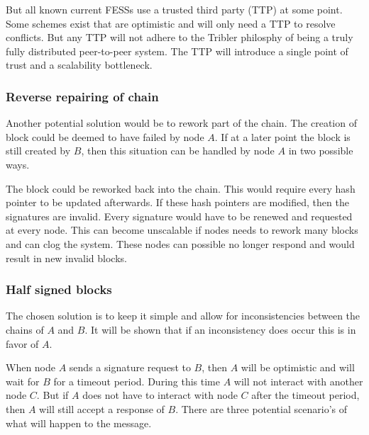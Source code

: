 But all known current FESSs use a trusted third party (TTP) at some point\cite{asokan-fairexchange}.
Some schemes exist that are optimistic and will only need a TTP to resolve conflicts.
But any TTP will not adhere to the Tribler philosphy 
of being a truly fully distributed peer-to-peer system.
The TTP will introduce a single point of trust and a scalability bottleneck.

\subsubsection{Reverse repairing of chain}
Another potential solution would be to rework part of the chain.
The creation of block could be deemed to have failed by node $A$.
If at a later point the block is still created by $B$,
then this situation can be handled by node $A$ in two possible ways.

The block could be reworked back into the chain.
This would require every hash pointer to be updated afterwards.
If these hash pointers are modified, then the signatures are invalid.
Every signature would have to be renewed and requested at every node.
This can become unscalable if nodes needs to rework many blocks and can clog the system.
These nodes can possible no longer respond and would result in new invalid blocks.

\subsubsection{Half signed blocks}
The chosen solution is to keep it simple and allow for inconsistencies between the chains of $A$ and $B$.
It will be shown that if an inconsistency does occur this is in favor of $A$.

When node $A$ sends a signature request to $B$,
then $A$ will be optimistic and will wait for $B$ for a timeout period.
During this time $A$ will not interact with another node $C$.
But if $A$ does not have to interact with node $C$ after the timeout period,
then $A$ will still accept a response of $B$.
There are three potential scenario's of what will happen to the message.

